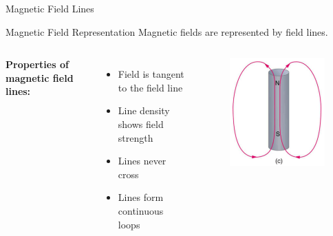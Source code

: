 \documentclass{beamer}
\begin{document}
\begin{frame}{Magnetic Field Lines}
\begin{block}{Magnetic Field Representation}
Magnetic fields are represented by field lines.
\end{block}

\begin{columns}
\textbf{Properties of magnetic field lines:}
\begin{itemize}
\item Field is tangent to the field line
\item Line density shows field strength
\item Lines never cross
\item Lines form continuous loops
\end{itemize}

\begin{figure}
\centering
\includegraphics[width=1\linewidth]{phys12-magnetism-magnetic-force-on-wire.png}
\end{figure}
\end{columns}
\end{frame}
\end{document}
